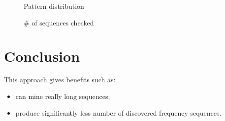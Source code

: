 \documentclass[journal]{IEEEtran}
\begin{document}
\begin{figure}[H]
\caption*{Pattern distribution}
\caption*{\# of sequences checked}
\end{figure}

\section{Conclusion}
This approach gives benefits such as:
\begin{itemize}
  \item can mine really long sequences;
  \item produce significantly less number of discovered frequency sequences.
\end{itemize}
\end{document}
